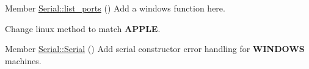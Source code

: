 
\begin{DoxyRefList}
\item[Member \mbox{\hyperlink{class_serial_a708b7835e206016b3b83c4991b2ce6f7}{Serial\+::list\+\_\+ports}} ()]\label{todo__todo000002}%
%
Add a windows function here. 

\label{todo__todo000003}%
%
Change linux method to match {\bfseries{APPLE}}.  
\item[Member \mbox{\hyperlink{class_serial_a3667c3137f2df94716b5193f9fb736ab}{Serial\+::Serial}} ()]\label{todo__todo000001}%
%
Add serial constructor error handling for {\bfseries{WINDOWS}} machines. 
\end{DoxyRefList}